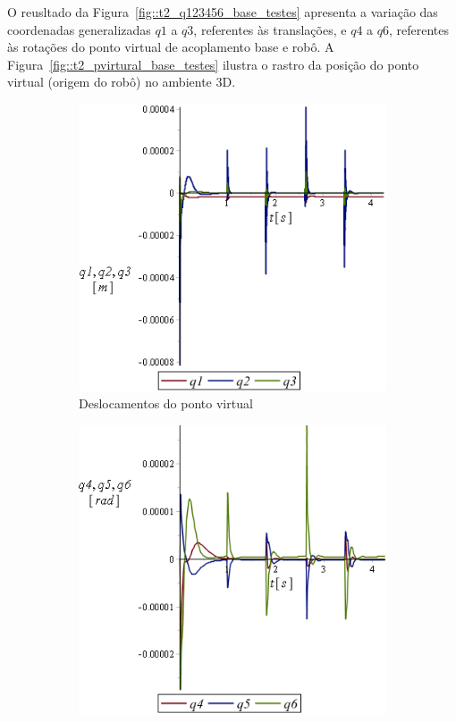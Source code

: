 O reusltado da Figura~\ref{fig::t2_q123456_base_testes} apresenta a variação das
coordenadas generalizadas $q1$ a $q3$, referentes às translações, e $q4$ a $q6$,
referentes às rotações do ponto virtual de acoplamento base e robô. A
Figura~\ref{fig::t2_pvirtural_base_testes} ilustra o rastro da posição do ponto
virtual (origem do robô) no ambiente 3D.

\begin{figure}[h]
    \centering
    \begin{subfigure}[b]{0.48\textwidth}
        \includegraphics[width=\textwidth]{figs/t2_q123_base_testes}
        \caption{Deslocamentos do ponto virtual}
        \label{fig::t2_q123_base_testes}
    \end{subfigure}
    \quad %
    \begin{subfigure}[b]{0.48\textwidth}
        \includegraphics[width=\textwidth]{figs/t2_q456_base_testes}

\end{subfigure}
\end{figure}
